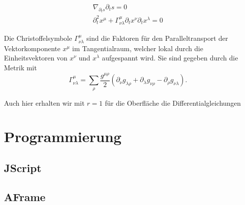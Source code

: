 \documentclass{article}
\begin{document}
\begin{eqnarray}
\nabla_{\partial_t s}\partial_t s=0 \\
\partial_t ^2 x^\mu +\Gamma_{\nu\lambda}^\mu \partial_t x^\nu \partial_t x^\lambda =0 
\end{eqnarray} 

Die Christoffelsymbole $\Gamma_{\nu\lambda}^\mu$ sind die Faktoren für den Paralleltransport der Vektorkomponente $x^\mu$ im Tangentialraum, welcher lokal durch die Einheitsvektoren von $x^\nu$ und $x^\lambda$ aufgespannt wird. Sie sind gegeben durch die Metrik mit
\begin{equation}
\Gamma_{\nu \lambda}^\mu = \sum_{\rho}\frac{g^{\mu \rho}}{2}(\partial_{\nu}g_{\lambda \rho}+\partial_{\lambda}g_{\nu \rho}-\partial_{\rho}g_{\nu \lambda}).
\end{equation}

Auch hier erhalten wir mit $r=1$ für die Oberfläche die Differentialgleichungen




\section{Programmierung}

\subsection{JScript}
\subsection{AFrame}
\end{document}
